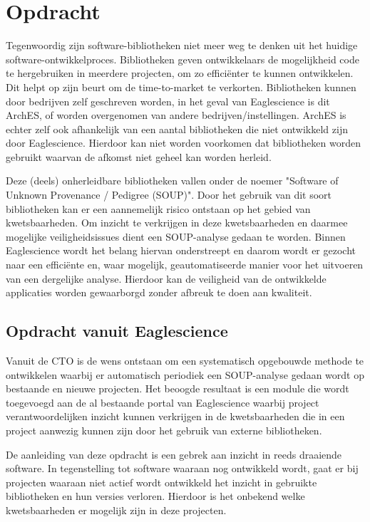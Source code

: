 
\chapter{Opdracht}\label{ch:opdracht} %
Tegenwoordig zijn software-bibliotheken niet meer weg te denken uit het huidige software-ontwikkelproces. Bibliotheken geven ontwikkelaars de mogelijkheid code te hergebruiken in meerdere projecten, om zo efficiënter te kunnen ontwikkelen. Dit helpt op zijn beurt om de time-to-market te verkorten. Bibliotheken kunnen door bedrijven zelf geschreven worden, in het geval van Eaglescience is dit ArchES, of worden overgenomen van andere bedrijven/instellingen. ArchES is echter zelf ook afhankelijk van een aantal bibliotheken die niet ontwikkeld zijn door Eaglescience. Hierdoor kan niet worden voorkomen dat bibliotheken worden gebruikt waarvan de afkomst niet geheel kan worden herleid.

Deze (deels) onherleidbare bibliotheken vallen onder de noemer "Software of Unknown Provenance / Pedigree (SOUP)". Door het gebruik van dit soort bibliotheken kan er een aannemelijk risico ontstaan op het gebied van kwetsbaarheden. Om inzicht te verkrijgen in deze kwetsbaarheden en daarmee mogelijke veiligheidsissues dient een SOUP-analyse gedaan te worden. Binnen Eaglescience wordt het belang hiervan onderstreept en daarom wordt er gezocht naar een efficiënte en, waar mogelijk, geautomatiseerde manier voor het uitvoeren van een dergelijke analyse. Hierdoor kan de veiligheid van de ontwikkelde applicaties worden gewaarborgd zonder afbreuk te doen aan kwaliteit.

\section{Opdracht vanuit Eaglescience}\label{sec:opdracht-vanuit-Eaglescience}

Vanuit de CTO is de wens ontstaan om een systematisch opgebouwde methode te ontwikkelen waarbij er automatisch periodiek een SOUP-analyse gedaan wordt op bestaande en nieuwe projecten. Het beoogde resultaat is een module die wordt toegevoegd aan de al bestaande portal van Eaglescience waarbij project verantwoordelijken inzicht kunnen verkrijgen in de kwetsbaarheden die in een project aanwezig kunnen zijn door het gebruik van externe bibliotheken.

De aanleiding van deze opdracht is een gebrek aan inzicht in reeds draaiende software. In tegenstelling tot software waaraan nog ontwikkeld wordt, gaat er bij projecten waaraan niet actief wordt ontwikkeld het inzicht in gebruikte bibliotheken en hun versies verloren. Hierdoor is het onbekend welke kwetsbaarheden er mogelijk zijn in deze projecten.
